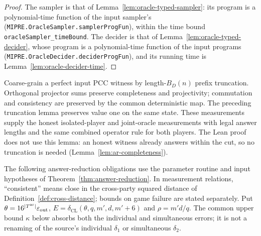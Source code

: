 \begin{proof}
\leanok
{}
The sampler is that of Lemma~\ref{lem:oracle-typed-sampler}: its program is a polynomial-time
function of the input sampler's (\texttt{MIPRE.OracleSampler.samplerProgFun}), within the time
bound \texttt{oracleSampler\_timeBound}. The decider is that of
Lemma~\ref{lem:oracle-typed-decider}, whose program is a polynomial-time function of the input
programs (\texttt{MIPRE.OracleDecider.deciderProgFun}), and its running time is
Lemma~\ref{lem:oracle-decider-time}.
\end{proof}

\begin{lemma}
\label{lem:oracle-timeout-pcc}
Coarse-grain a perfect input PCC witness by length-$B_D(n)$ prefix
truncation. Orthogonal projector sums preserve completeness and projectivity;
commutation and consistency are preserved by the common deterministic map.
The preceding truncation lemma preserves value one on the same state.
These measurements supply the honest isolated-player and joint-oracle
measurements with legal answer lengths and the same combined operator rule
for both players.
The Lean proof does not use this lemma: an honest witness already answers within the cut,
so no truncation is needed (Lemma~\ref{lem:ar-completeness}).
\end{lemma}

The following answer-reduction obligations use the parameter routine and
input hypotheses of Theorem~\ref{thm:answer-reduction}. In measurement
relations, ``consistent'' means close in the cross-party squared distance
of Definition~\ref{def:cross-distance}; bounds on game failure are stated
separately. Put $\theta=16^{|T^{\mathrm{ar}}|}\varepsilon_{\mathrm{out}}$,
$E=\delta_{\mathrm{CL}}(\theta,q,m',d,m'+6)$ and $\rho=m'd/q$.
The common upper bound $\kappa$ below absorbs both the individual and
simultaneous errors; it is not a renaming of the source's individual
$\delta_1$ or simultaneous $\delta_2$.

